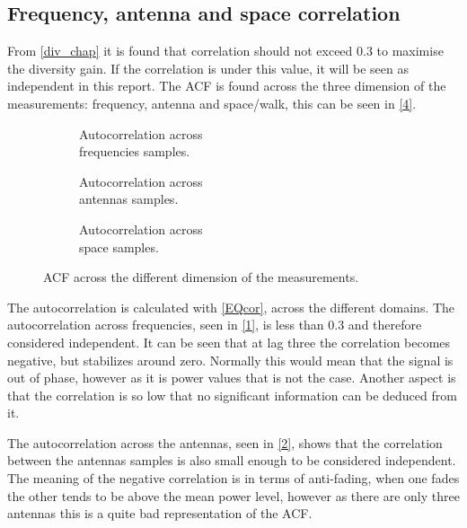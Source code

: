 \subsection{Frequency, antenna and space correlation}
From \autoref{div_chap} it is found that correlation should not exceed 0.3 to maximise the diversity gain. If the correlation is under this value, it will be seen as independent in this report. The \gls{ACF} is found across the three dimension of the measurements: frequency, antenna and space/walk, this can be seen in \autoref{4}.

\begin{figure}[H]
\captionsetup{belowskip=0em}
\centering
\begin{subfigure}[b]{0.326\textwidth}

\caption{Autocorrelation across \\ frequencies samples.}
\label{1}
\end{subfigure}
\begin{subfigure}[b]{0.326\textwidth}

\caption{Autocorrelation across \\antennas samples.}
\label{2}
\end{subfigure}
\begin{subfigure}[b]{0.326\textwidth}

\caption{Autocorrelation across \\space samples.}
\label{3}
\end{subfigure}
\captionsetup{belowskip=-1.5em}
\caption{\gls{ACF} across the different dimension of the measurements.}
\label{4}
\end{figure}

The autocorrelation is calculated with \autoref{EQcor}, across the different domains. The autocorrelation across frequencies, seen in \autoref{1}, is less than 0.3 and therefore considered independent. It can be seen that at lag three the correlation becomes negative, but stabilizes around zero. Normally this would mean that the signal is out of phase, however as it is power values that is not the case. Another aspect is that the correlation is so low that no significant information can be deduced from it.

The autocorrelation across the antennas, seen in \autoref{2}, shows that the correlation between the antennas samples is also small enough to be considered independent. The meaning of the negative correlation is in terms of anti-fading, when one fades the other tends to be above the mean power level, however as there are only three antennas this is a quite bad representation of the \gls{ACF}.

